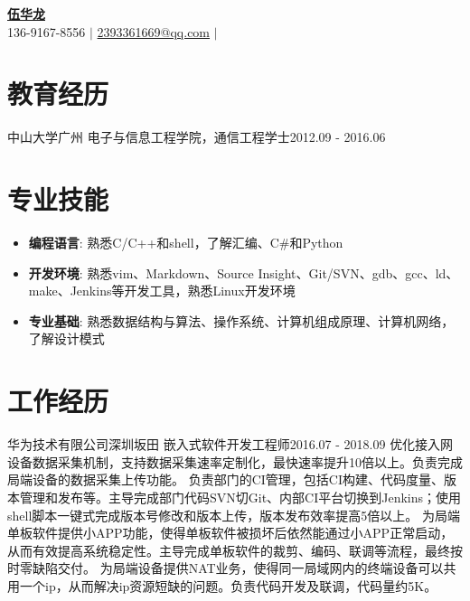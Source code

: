 



\begin{center}
  \small \textbf{\href{http://www.cnblogs.com/wuhualong/}{\huge 伍华龙}} \\  
  136-9167-8556 $\vert$
  \href{mailto:2393361669@qq.com}{2393361669@qq.com} $\vert$
  \href{https://github.com/whl1729}{\color{blue}{https://github.com/whl1729}} \\
\end{center}

\section{教育经历}
  \resumeSubHeadingListStart
    \resumeSubheading
      {中山大学}{广州}
      {电子与信息工程学院，通信工程学士}{2012.09 - 2016.06}
  \resumeSubHeadingListEnd

\section{专业技能}
  \begin{itemize}[leftmargin=*]
    \item \textbf{编程语言}: 熟悉C/C++和shell，了解汇编、C\#和Python
    \item \textbf{开发环境}: 熟悉vim、Markdown、Source Insight、Git/SVN、gdb、gcc、ld、make、Jenkins等开发工具，熟悉Linux开发环境
    \item \textbf{专业基础}: 熟悉数据结构与算法、操作系统、计算机组成原理、计算机网络，了解设计模式
  \end{itemize}

\section{工作经历}
  \resumeSubHeadingListStart

    \resumeSubheading
      {华为技术有限公司}{深圳坂田}
      {嵌入式软件开发工程师}{2016.07 - 2018.09}
      \resumeItemListStart
          {优化接入网设备数据采集机制，支持数据采集速率定制化，最快速率提升10倍以上。负责完成局端设备的数据采集上传功能。}
          {负责部门的CI管理，包括CI构建、代码度量、版本管理和发布等。主导完成部门代码SVN切Git、内部CI平台切换到Jenkins；使用shell脚本一键式完成版本号修改和版本上传，版本发布效率提高5倍以上。}
          {为局端单板软件提供小APP功能，使得单板软件被损坏后依然能通过小APP正常启动，从而有效提高系统稳定性。主导完成单板软件的裁剪、编码、联调等流程，最终按时零缺陷交付。}
          {为局端设备提供NAT业务，使得同一局域网内的终端设备可以共用一个ip，从而解决ip资源短缺的问题。负责代码开发及联调，代码量约5K。}
      \resumeItemListEnd

